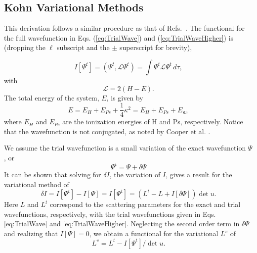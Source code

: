\documentclass[preprint,showpacs,showkeys,preprintnumbers,amsmath,amssymb,longbibliography,pra,aps]{revtex4-1}
\begin{document}
\subsection{Kohn Variational Methods}
\label{sec:Kohn}
This derivation follows a similar procedure as that of
Refs.~\cite{Lucchese1989,Cooper2010,Armour1991,VanReethThesis}.
The functional for the full wavefunction in Eqs. (\ref{eq:TrialWave}) and
(\ref{eq:TrialWaveHigher}) is (dropping the $\ell$ subscript and the $\pm$ 
superscript for brevity),

\begin{equation}
I[\Psi^t] = \left(\Psi^t, \mathcal{L} \Psi^t \right) = \int \Psi^t \mathcal{L}
  \Psi^t \,d\tau,
\label{eq:IlDefPsi}
\end{equation}
with
\begin{equation}
\mathcal{L} = 2(H - E).
\label{eq:LDef}
\end{equation}
The total energy of the system, $E$, is given by
\begin{equation}
\label{eq:TotalEnergy}
E = E_H + E_{Ps} + \frac{1}{4}\kappa^2 = E_H + E_{Ps} + E_{\bm \kappa},
\end{equation}
where $E_H$ and $E_{Ps}$ are the ionization energies of H and Ps, respectively.
Notice that the wavefunction is not conjugated, as noted by Cooper et al.
\cite{Cooper2010}.

We assume the trial wavefunction is a small variation of the exact wavefunction
$\Psi$, or
\begin{equation}
\Psi^t = \Psi + \delta \Psi
\label{eq:PsiTrialRelation}
\end{equation}
It can be shown that solving for $\delta I$, the variation of $I$, gives a
result for the variational method of
\begin{equation}
\delta I = I[\Psi^t] - I[\Psi] = I[\Psi^t] = (L^t - L + I[\delta \Psi]) \det u.
\label{eq:IlPsiVariation}
\end{equation}
Here $L$ and $L^t$ correspond to the scattering parameters for the exact and 
trial wavefunctions, respectively, with the trial wavefunctions given in 
Eqs. \ref{eq:TrialWave} and \ref{eq:TrialWaveHigher}. Neglecting the second 
order term in $\delta \Psi$ and realizing that $I[\Psi] = 0$, we obtain a 
functional for the variational $L^v$ of
\begin{equation}
L^v = L^t - I[\Psi^t] / \det u.
\label{eq:ComplexKohnVariation}
\end{equation}
\end{document}
